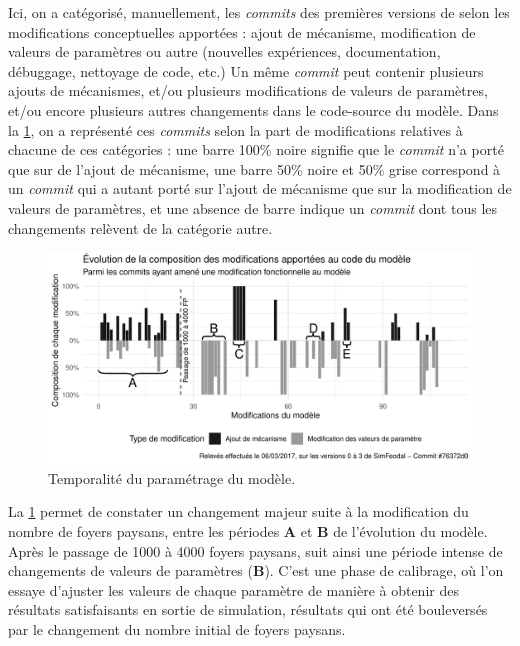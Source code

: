 Ici, on a catégorisé, manuellement, les \textit{commits} des premières versions de \simfeodal{} selon les modifications conceptuelles apportées : ajout de mécanisme, modification de valeurs de paramètres ou autre (nouvelles expériences, documentation, débuggage, nettoyage de code, etc.)
Un même \textit{commit} peut contenir plusieurs ajouts de mécanismes, et/ou plusieurs modifications de valeurs de paramètres, et/ou encore plusieurs autres changements dans le code-source du modèle.
Dans la \cref{fig:comits-periodes}, on a représenté ces \textit{commits} selon la part de modifications relatives à chacune de ces catégories : une barre 100\% noire signifie que le \textit{commit} n'a porté que sur de l'ajout de mécanisme, une barre 50\% noire et 50\% grise correspond à un \textit{commit} qui a autant porté sur l'ajout de mécanisme que sur la modification de valeurs de paramètres, et une absence de barre indique un \textit{commit} dont tous les changements relèvent de la catégorie \og autre\fg{}.

\begin{figure}[H]
	\includegraphics[width = \linewidth]{img/plotComits_clean.pdf}
	\caption[Temporalité du paramétrage du modèle.]{Temporalité du paramétrage du modèle.}
	\label{fig:comits-periodes}
\end{figure}

La \cref{fig:comits-periodes} permet de constater un changement majeur suite à la modification du nombre de foyers paysans, entre les périodes \textbf{A} et \textbf{B} de l'évolution du modèle.
Après le passage de 1000 à 4000 foyers paysans, suit ainsi une période intense de changements de valeurs de paramètres (\textbf{B}).
C'est une phase de calibrage, où l'on essaye d'ajuster les valeurs de chaque paramètre de manière à obtenir des résultats satisfaisants en sortie de simulation, résultats qui ont été bouleversés par le changement du nombre initial de foyers paysans.

